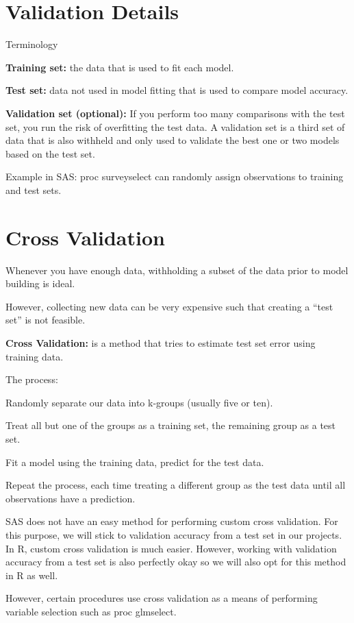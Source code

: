 \documentclass[12pt]{../notes}
\begin{document}
\section{Validation Details}
Terminology
\bi
\item \textbf{Training set:} the data that is used to fit each model. 
\item \textbf{Test set:} data not used in model fitting that is used to compare model accuracy. 
\item \textbf{Validation set (optional):} If you perform too many comparisons with the test set, you run the risk of overfitting the test data. A validation set is a third set of data that is also withheld and only used to validate the best one or two models based on the test set. 
\ei

Example in SAS: proc surveyselect can randomly assign observations to training and test sets. 

\section{Cross Validation}
Whenever you have enough data, withholding a subset of the data prior to model building is ideal. 

\nspace
However, collecting new data can be very expensive such that creating a ``test set'' is not feasible. 

\textbf{Cross Validation:} is a method that tries to estimate test set error using training data. 

\nspace The process:
\bi 
\item Randomly separate our data into k-groups (usually five or ten). 
\item Treat all but one of the groups as a training set, the remaining group as a test set. 
\item Fit a model using the training data, predict for the test data. 
\item Repeat the process, each time treating a different group as the test data until all observations have a prediction. 
\ei

\nspace
SAS does not have an easy method for performing custom cross validation. For this purpose, we will stick to validation accuracy from a test set in our projects. In R, custom cross validation is much easier. However, working with validation accuracy from a test set is also perfectly okay so we will also opt for this method in R as well.

\nspace
However, certain procedures use cross validation as a means of performing variable selection such as proc glmselect. 
\end{document}

